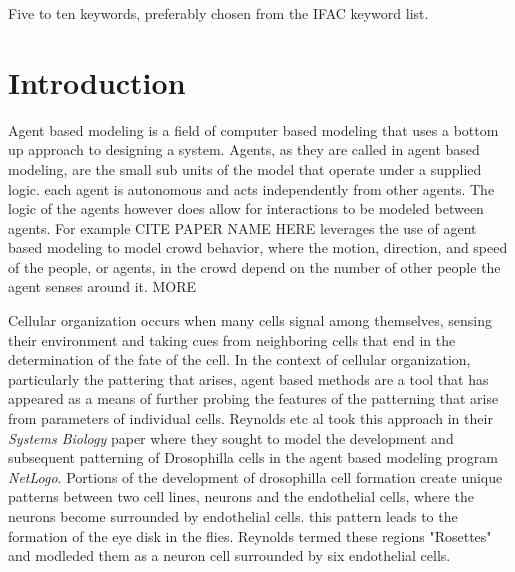 \begin{frontmatter}
\begin{abstract}
{\large Conclusion:}

The extended model developed from the base work from Reynolds etc Al was able to both verify single genotype two layer, and was able to capture key features of the circuits tested in Todo etc al when under diffusion constraints. The addition of cell mobility extended the capabilities of the original model to test pattering under non-fixed cell populations.

\end{abstract}

\begin{keyword}
Five to ten keywords, preferably chosen from the IFAC keyword list.
\end{keyword}

\end{frontmatter}

\section{Introduction}
Agent based modeling is a field of computer based modeling that uses a bottom up approach to designing a system. Agents, as they are called in agent based modeling, are the small sub units of the model that operate under a supplied logic. each agent is autonomous and acts independently from other agents. The logic of the agents however does allow for interactions to be modeled between agents. For example CITE PAPER NAME HERE leverages the use of agent based modeling to model crowd behavior, where the motion, direction, and speed of the people, or agents, in the crowd depend on the number of other people the agent senses around it.  MORE

Cellular organization occurs when many cells signal among themselves, sensing their environment and taking cues from neighboring cells that end in the determination of the fate of the cell. In the context of cellular organization, particularly the pattering that arises, agent based methods are a tool that has appeared as a means of further probing the features of the patterning that arise from parameters of individual cells. Reynolds etc al took this approach in their \emph{Systems Biology} paper where they sought to model the development and subsequent patterning of Drosophilla cells in the agent based modeling program \emph{NetLogo}. Portions of the development of drosophilla cell formation create unique patterns between two cell lines, neurons and the endothelial cells, where the neurons become surrounded by endothelial cells. this pattern leads to the formation of the eye disk in the flies. Reynolds termed these regions "Rosettes" and modleded them as a neuron cell surrounded by six endothelial cells.

